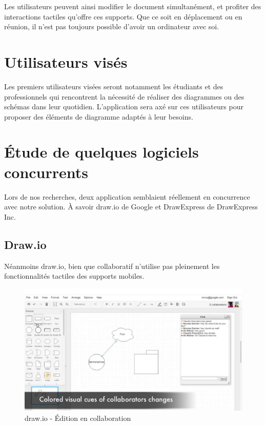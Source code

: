 \documentclass[a4paper,11pt]{article}
\begin{document}
Les utilisateurs peuvent ainsi modifier le document simultanément, et profiter des interactions tactiles qu'offre ces supports.
Que ce soit en déplacement ou en réunion, il n'est pas toujours possible d'avoir un ordinateur avec soi.
 

\section{Utilisateurs visés}
Les premiers utilisateurs visées seront notamment les étudiants et des professionnels qui rencontrent la nécessité de réaliser des diagrammes ou des schémas dans leur quotidien.
L'application sera axé sur ces utilisateurs pour proposer des éléments de diagramme adaptés à leur besoins.







\newpage
\section{Étude de quelques logiciels concurrents}
Lors de nos recherches, deux application semblaient réellement en concurrence avec notre solution. À savoir draw.io de Google et DrawExpress de DrawExpress Inc.



\subsection{Draw.io}
Néanmoins draw.io, bien que collaboratif n'utilise pas pleinement les fonctionnalités tactiles des supports mobiles.

\begin{figure}[h]
	\centering
	\includegraphics[width=\textwidth]{img/drawio}
	\caption{draw.io - Édition en collaboration}
\end{figure}
\end{document}
